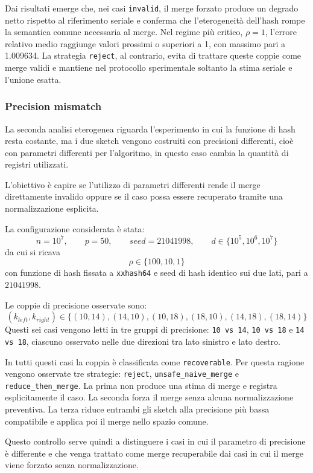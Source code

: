   Dai risultati emerge che, nei casi \texttt{invalid}, il merge forzato produce un
  degrado netto rispetto al riferimento seriale e conferma che l'eterogeneità
  dell'hash rompe la semantica comune necessaria al merge. Nel regime più
  critico, \(\rho=1\), l'errore relativo medio raggiunge valori prossimi o
  superiori a 1, con massimo pari a 1.009634. La strategia \texttt{reject}, al
  contrario, evita di trattare queste coppie come merge validi e mantiene nel
  protocollo sperimentale soltanto la stima seriale e l'unione esatta.

\subsubsection{Precision mismatch}

  La seconda analisi eterogenea riguarda l'esperimento in cui la funzione di hash resta
  costante, ma i due sketch vengono costruiti con precisioni differenti, cio\`e con parametri differenti
  per l'algoritmo, in questo caso cambia la quantit\`a di registri utilizzati.

  L'obiettivo è capire se l'utilizzo di parametri differenti rende il merge
  direttamente invalido oppure se il caso possa essere recuperato tramite una
  normalizzazione esplicita.

  La configurazione considerata è stata:
  \[
  n=10^7,\qquad p=50,\qquad seed=21041998,\qquad
  d\in\{10^5,10^6,10^7\}
  \]
  da cui si ricava
  \[
  \rho\in\{100,10,1\}
  \]
  con funzione di hash fissata a \texttt{xxhash64} e seed di hash identico sui
  due lati, pari a \(21041998\).

  Le coppie di precisione osservate sono:
  \[
  (k_{left},k_{right}) \in
  \{(10,14),(14,10),(10,18),(18,10),(14,18),(18,14)\}
  \]
  Questi sei casi vengono letti in tre gruppi di precisione:
  \texttt{10 vs 14}, \texttt{10 vs 18} e \texttt{14 vs 18}, ciascuno osservato
  nelle due direzioni tra lato sinistro e lato destro.

  In tutti questi casi la coppia è classificata come \texttt{recoverable}. Per
  questa ragione vengono osservate tre strategie:
  \texttt{reject}, \texttt{unsafe\_naive\_merge} e
  \texttt{reduce\_then\_merge}. La prima non produce una stima di merge e
  registra esplicitamente il caso. La seconda forza il merge senza alcuna
  normalizzazione preventiva. La terza riduce entrambi gli sketch alla precisione
  più bassa compatibile e applica poi il merge nello spazio comune.

  Questo controllo serve quindi a distinguere i casi in cui il parametro di precisione \`e differente
e che venga trattato come merge recuperabile dai casi in cui il
  merge viene forzato senza normalizzazione.

